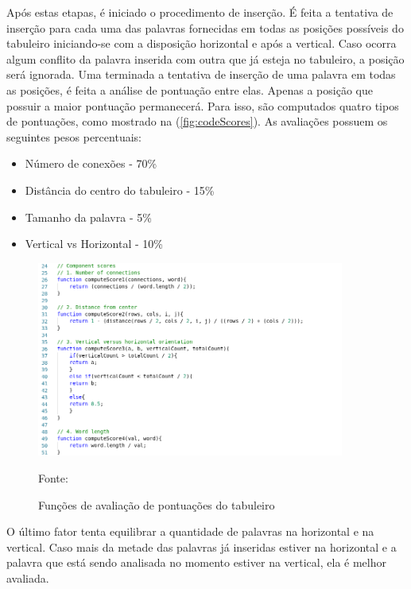 Após estas etapas, é iniciado o procedimento de inserção. É feita a tentativa de inserção para cada uma das palavras fornecidas em todas as posições possíveis do tabuleiro iniciando-se com a disposição horizontal e após a vertical. Caso ocorra algum conflito da palavra inserida com outra que já esteja no tabuleiro, a posição será ignorada. Uma terminada a tentativa de inserção de uma palavra em todas as posições, é feita a análise de pontuação entre elas. Apenas a posição que possuir a maior pontuação permanecerá. Para isso, são computados quatro tipos de pontuações, como mostrado na (\autoref{fig:codeScores}). As avaliações possuem os seguintes pesos percentuais:

\begin{itemize}
    \item Número de conexões - 70\%
    \item Distância do centro do tabuleiro - 15\%
    \item Tamanho da palavra - 5\%
    \item Vertical vs Horizontal - 10\%
\end{itemize}

\begin{figure}[H]
\centering
    \caption{Funções de avaliação de pontuações do tabuleiro}
    \label{fig:codeScores}
    \includegraphics[width=0.9\textwidth]{Figuras/codeComponentScores.png}
    
    Fonte: \cite{layoutGenerator}
\end{figure}

O último fator tenta equilibrar a quantidade de palavras na horizontal e na vertical. Caso mais da metade das palavras já inseridas estiver na horizontal e a palavra que está sendo analisada no momento estiver na vertical, ela é melhor avaliada.

